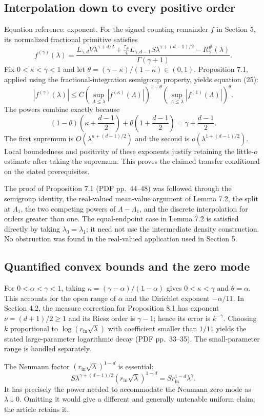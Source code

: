 \documentclass[10pt]{article}
\begin{document}
\subsection*{Interpolation down to every positive order}
Equation reference: exponent. For the signed counting remainder \(f\) in Section 5, its normalized fractional primitive satisfies \[f^{(\gamma)}(\lambda)=
 \frac{L_{\gamma,d}V\lambda^{\gamma+d/2}
 +\tfrac{\tau_\#}{4}L_{\gamma,d-1}S\lambda^{\gamma+(d-1)/2}
 -R_\gamma^\#(\lambda)}{\Gamma(\gamma+1)}.\] Fix \(0<\kappa<\gamma<1\) and let \(\theta=(\gamma-\kappa)/(1-\kappa)\in(0,1)\). Proposition 7.1, applied using the fractional-integration semigroup property, yields equation (25): \[|f^{(\gamma)}(\lambda)|\le C
 \left(\sup_{\Lambda\le\lambda}|f^{(\kappa)}(\Lambda)|\right)^{1-\theta}
 \left(\sup_{\Lambda\le\lambda}|f^{(1)}(\Lambda)|\right)^\theta .\] The powers combine exactly because \[(1-\theta)\left(\kappa+\frac{d-1}{2}\right)
 +\theta\left(1+\frac{d-1}{2}\right)
 =\gamma+\frac{d-1}{2}.
 \] The first supremum is \(O(\lambda^{\kappa+(d-1)/2})\) and the second is \(o(\lambda^{1+(d-1)/2})\). Local boundedness and positivity of these exponents justify retaining the little-\(o\) estimate after taking the supremum. This proves the claimed transfer conditional on the stated prerequisites.\par
The proof of Proposition 7.1 (PDF pp. 44–48) was followed through the semigroup identity, the real-valued mean-value argument of Lemma 7.2, the split at \(\Lambda_1\), the two competing powers of \(\Lambda-\Lambda_1\), and the discrete interpolation for orders greater than one. The equal-endpoint case in Lemma 7.2 is satisfied directly by taking \(\lambda_0=\lambda_1\); it need not use the intermediate density construction. No obstruction was found in the real-valued application used in Section 5.\par
\subsection*{Quantified convex bounds and the zero mode}
For \(0<\alpha<\gamma<1\), taking \(\kappa=(\gamma-\alpha)/(1-\alpha)\) gives \(0<\kappa<\gamma\) and \(\theta=\alpha\). This accounts for the open range of \(\alpha\) and the Dirichlet exponent \(-\alpha/11\). In Section 4.2, the measure correction for Proposition 8.1 has exponent \(\nu=(d+1)/2\ge1\) and its Riesz order is \(\gamma-1\); hence its error is \(k^{-\gamma}\). Choosing \(k\) proportional to \(\log(r_{\mathrm{in}}\sqrt\lambda)\) with coefficient smaller than \(1/11\) yields the stated large-parameter logarithmic decay (PDF pp. 33–35). The small-parameter range is handled separately.\par
The Neumann factor \((r_{\mathrm{in}}\sqrt\lambda)^{1-d}\) is essential: \[S\lambda^{\gamma+(d-1)/2}
 (r_{\mathrm{in}}\sqrt\lambda)^{1-d}
 =Sr_{\mathrm{in}}^{1-d}\lambda^\gamma .\] It has precisely the power needed to accommodate the Neumann zero mode as \(\lambda\downarrow0\). Omitting it would give a different and generally untenable uniform claim; the article retains it.\par
\end{document}

